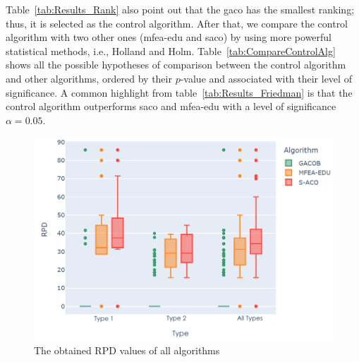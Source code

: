 \bigskip
\begin{table}[!htp]
	\centering
	\caption{The z-values and p-values of the Friedman procedures ( is the control algorithm)} 
	\label{tab:CompareControlAlg}
\end{table}
\bigskip
Table~\ref{tab:Results_Rank} also point out that the \acrshort{gaco} has the smallest ranking; thus, it is selected as the control algorithm. After that, we compare the control algorithm with two other ones (\acrshort{mfea-edu} and \acrshort{saco}) by using more powerful statistical methods, i.e., Holland and Holm. Table~\ref{tab:CompareControlAlg} shows all the possible hypotheses of comparison between the control algorithm and other algorithms, ordered by their $p$-value and associated with their level of significance. A common highlight from table~\ref{tab:Results_Friedman} is that the control algorithm outperforms \acrshort{saco} and \acrshort{mfea-edu} with a level of significance $\alpha = 0.05$.
\bigskip
\renewcommand{\scalefigure}{0.5}
\begin{figure}[htbp]
	\centering
	\includegraphics[scale=\scalefigure]{Figures/chap 4/RPD_each_set.png}
	\caption{The obtained RPD values of all algorithms}
	\label{fig:rpd}
\end{figure}
\bigskip
